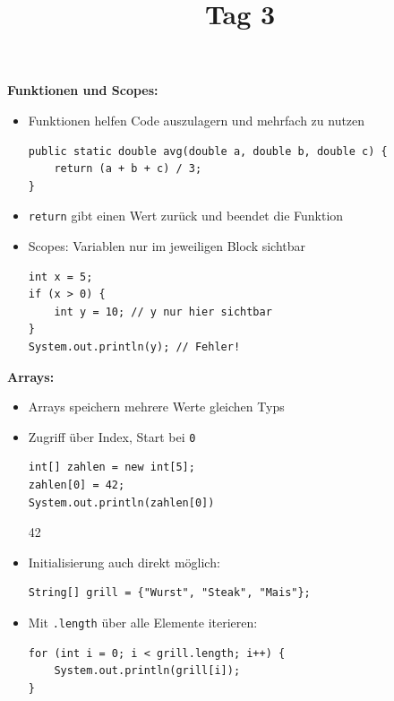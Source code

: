 \documentclass{../../sheet}
\title{\vkTitle\ Tag 3}
\begin{document}
\maketitle

\textbf{Funktionen und Scopes:}
\begin{itemize}
    \item Funktionen helfen Code auszulagern und mehrfach zu nutzen
          \begin{verbatim}
public static double avg(double a, double b, double c) {
    return (a + b + c) / 3;
}
          \end{verbatim}
    \item \texttt{return} gibt einen Wert zurück und beendet die Funktion
    \item Scopes: Variablen nur im jeweiligen Block sichtbar
          \begin{verbatim}
int x = 5;
if (x > 0) {
    int y = 10; // y nur hier sichtbar
}
System.out.println(y); // Fehler!
          \end{verbatim}
\end{itemize}

\textbf{Arrays:}

\begin{itemize}
    \item Arrays speichern mehrere Werte gleichen Typs
    \item Zugriff über Index, Start bei \texttt{0}
          \begin{verbatim}
int[] zahlen = new int[5];
zahlen[0] = 42;
System.out.println(zahlen[0])
          \end{verbatim}
          \begin{ausgabe}
              42
          \end{ausgabe}
    \item Initialisierung auch direkt möglich:
          \begin{verbatim}
String[] grill = {"Wurst", "Steak", "Mais"};
          \end{verbatim}
    \item Mit \texttt{.length} über alle Elemente iterieren:
          \begin{verbatim}
for (int i = 0; i < grill.length; i++) {
    System.out.println(grill[i]);
}
          \end{verbatim}
\end{itemize}
\end{document}
